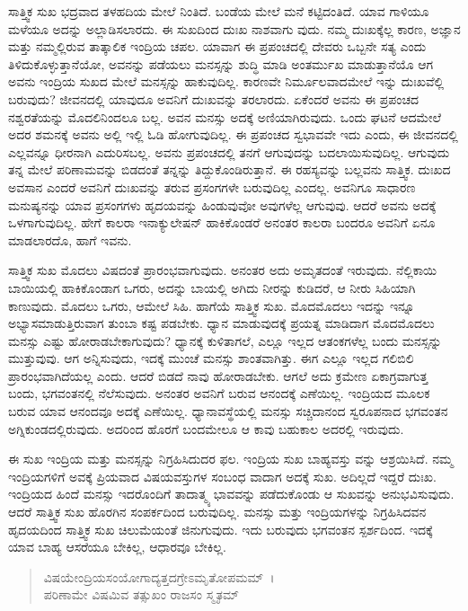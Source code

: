 ಸಾತ್ತ್ವಿಕ ಸುಖ ಭದ್ರವಾದ ತಳಹದಿಯ ಮೇಲೆ ನಿಂತಿದೆ. ಬಂಡೆಯ ಮೇಲೆ ಮನೆ ಕಟ್ಟಿದಂತಿದೆ. ಯಾವ ಗಾಳಿಯೂ ಮಳೆಯೂ ಅದನ್ನು ಅಲ್ಲಾಡಿಸಲಾರದು. ಈ ಸುಖದಿಂದ ದುಃಖ ನಾಶವಾಗು ವುದು. ನಮ್ಮ ದುಃಖಕ್ಕೆಲ್ಲ ಕಾರಣ, ಅಜ್ಞಾನ ಮತ್ತು ನಮ್ಮಲ್ಲಿರುವ ತಾತ್ಕಾಲಿಕ ಇಂದ್ರಿಯ ಚಪಲ. ಯಾವಾಗ ಈ ಪ್ರಪಂಚದಲ್ಲಿ ದೇವರು ಒಬ್ಬನೇ ಸತ್ಯ ಎಂದು ತಿಳಿದುಕೊಳ್ಳುತ್ತಾನೆಯೋ, ಅವನನ್ನು ಪಡೆಯಲು ಮನಸ್ಸನ್ನು ಶುದ್ಧಿ ಮಾಡಿ ಅಂತರ್ಮುಖ ಮಾಡುತ್ತಾನೆಯೊ ಆಗ ಅವನು ಇಂದ್ರಿಯ ಸುಖದ ಮೇಲೆ ಮನಸ್ಸನ್ನು ಹಾಕುವುದಿಲ್ಲ. ಕಾರಣವೇ ನಿರ್ಮೂಲವಾದಮೇಲೆ ಇನ್ನು ದುಃಖವೆಲ್ಲಿ ಬರುವುದು? ಜೀವನದಲ್ಲಿ ಯಾವುದೂ ಅವನಿಗೆ ದುಃಖವನ್ನು ತರಲಾರದು. ಏಕೆಂದರೆ ಅವನು ಈ ಪ್ರಪಂಚದ ನಶ್ವರತೆಯನ್ನು ಮೊದಲಿನಿಂದಲೂ ಬಲ್ಲ. ಅವನ ಮನಸ್ಸು ಅದಕ್ಕೆ ಅಣಿಯಾಗಿರುವುದು. ಒಂದು ಘಟನೆ ಆದಮೇಲೆ ಅದರ ಶಮನಕ್ಕೆ ಅವನು ಅಲ್ಲಿ ಇಲ್ಲಿ ಓಡಿ ಹೋಗುವುದಿಲ್ಲ. ಈ ಪ್ರಪಂಚದ ಸ್ವಭಾವವೇ ಇದು ಎಂದು, ಈ ಜೀವನದಲ್ಲಿ ಎಲ್ಲವನ್ನೂ ಧೀರನಾಗಿ ಎದುರಿಸಬಲ್ಲ. ಅವನು ಪ್ರಪಂಚದಲ್ಲಿ ತನಗೆ ಆಗುವುದನ್ನು ಬದಲಾಯಿಸುವುದಿಲ್ಲ. ಆಗುವುದು ತನ್ನ ಮೇಲೆ ಪರಿಣಾಮವನ್ನು ಬಿಡದಂತೆ ತನ್ನನ್ನು ತಿದ್ದುಕೊಂಡಿರುತ್ತಾನೆ. ಈ ರಹಸ್ಯವನ್ನು ಬಲ್ಲವನು ಸಾತ್ತ್ವಿಕ. ದುಃಖದ ಅವಸಾನ ಎಂದರೆ ಅವನಿಗೆ ದುಃಖವನ್ನು ತರುವ ಪ್ರಸಂಗಗಳೇ ಬರುವುದಿಲ್ಲ ಎಂದಲ್ಲ. ಅವನಿಗೂ ಸಾಧಾರಣ ಮನುಷ್ಯನನ್ನು ಯಾವ ಪ್ರಸಂಗಗಳು ಹೃದಯವನ್ನು ಹಿಂಡುವುವೋ ಅವುಗಳೆಲ್ಲ ಆಗುವುವು. ಆದರೆ ಅವನು ಅದಕ್ಕೆ ಒಳಗಾಗುವುದಿಲ್ಲ. ಹೇಗೆ ಕಾಲರಾ ಇನಾಕ್ಯುಲೇಷನ್ ಹಾಕಿಕೊಂಡರೆ ಅನಂತರ ಕಾಲರಾ ಬಂದರೂ ಅವನಿಗೆ ಏನೂ ಮಾಡಲಾರದೊ, ಹಾಗೆ ಇವನು.

ಸಾತ್ತ್ವಿಕ ಸುಖ ಮೊದಲು ವಿಷದಂತೆ ಪ್ರಾರಂಭವಾಗುವುದು. ಅನಂತರ ಅದು ಅಮೃತದಂತೆ ಇರುವುದು. ನೆಲ್ಲಿಕಾಯಿ ಬಾಯಿಯಲ್ಲಿ ಹಾಕಿಕೊಂಡಾಗ ಒಗರು, ಅದನ್ನು ಬಾಯಲ್ಲಿ ಅಗಿದು ನೀರನ್ನು ಕುಡಿದರೆ, ಆ ನೀರು ಸಿಹಿಯಾಗಿ ಕಾಣುವುದು. ಮೊದಲು ಒಗರು, ಆಮೇಲೆ ಸಿಹಿ. ಹಾಗೆಯೆ ಸಾತ್ತ್ವಿಕ ಸುಖ. ಮೊದಮೊದಲು ಇದನ್ನು ಇನ್ನೂ ಅಭ್ಯಾಸಮಾಡುತ್ತಿರುವಾಗ ತುಂಬಾ ಕಷ್ಟ ಪಡಬೇಕು. ಧ್ಯಾನ ಮಾಡುವುದಕ್ಕೆ ಪ್ರಯತ್ನ ಮಾಡಿದಾಗ ಮೊದಮೊದಲು ಮನಸ್ಸು ಎಷ್ಟು ಹೋರಾಡಬೇಕಾಗುವುದು? ಧ್ಯಾನಕ್ಕೆ ಕುಳಿತಾಗಲೆ, ಎಲ್ಲೂ ಇಲ್ಲದ ಆತಂಕಗಳೆಲ್ಲ ಬಂದು ಮನಸ್ಸನ್ನು ಮುತ್ತುವುವು. ಆಗ ಅನ್ನಿಸುವುದು, ಇದಕ್ಕೆ ಮುಂಚೆ ಮನಸ್ಸು ಶಾಂತವಾಗಿತ್ತು. ಈಗ ಎಲ್ಲೂ ಇಲ್ಲದ ಗಲಿಬಿಲಿ ಪ್ರಾರಂಭವಾಗಿದೆಯಲ್ಲ ಎಂದು. ಆದರೆ ಬಿಡದೆ ನಾವು ಹೋರಾಡಬೇಕು. ಆಗಲೆ ಅದು ಕ್ರಮೇಣ ಏಕಾಗ್ರವಾಗುತ್ತ ಬಂದು, ಭಗವಂತನಲ್ಲಿ ನೆಲೆಸುವುದು. ಅನಂತರ ಅವನಿಗೆ ಬರುವ ಆನಂದಕ್ಕೆ ಎಣೆಯಿಲ್ಲ. ಇಂದ್ರಿಯದ ಮೂಲಕ ಬರುವ ಯಾವ ಆನಂದವೂ ಅದಕ್ಕೆ ಎಣೆಯಿಲ್ಲ. ಧ್ಯಾನಾವಸ್ಥೆಯಲ್ಲಿ ಮನಸ್ಸು ಸಚ್ಚಿದಾನಂದ ಸ್ವರೂಪನಾದ ಭಗವಂತನ ಅಗ್ನಿಕುಂಡದಲ್ಲಿರುವುದು. ಅದರಿಂದ ಹೊರಗೆ ಬಂದಮೇಲೂ ಆ ಕಾವು ಬಹುಕಾಲ ಅದರಲ್ಲಿ ಇರುವುದು.

ಈ ಸುಖ ಇಂದ್ರಿಯ ಮತ್ತು ಮನಸ್ಸನ್ನು ನಿಗ್ರಹಿಸಿದುದರ ಫಲ. ಇಂದ್ರಿಯ ಸುಖ ಬಾಹ್ಯವಸ್ತು ವನ್ನು ಆಶ್ರಯಿಸಿದೆ. ನಮ್ಮ ಇಂದ್ರಿಯಗಳಿಗೆ ಅವಕ್ಕೆ ಪ್ರಿಯವಾದ ವಿಷಯವಸ್ತುಗಳ ಸಂಬಂಧ ವಾದಾಗ ಅದಕ್ಕೆ ಸುಖ. ಅದಿಲ್ಲದೆ ಇದ್ದರೆ ದುಃಖ. ಇಂದ್ರಿಯದ ಹಿಂದೆ ಮನಸ್ಸು ಇದರೊಂದಿಗೆ ತಾದಾತ್ಮ್ಯ ಭಾವವನ್ನು ಪಡೆದುಕೊಂಡು ಆ ಸುಖವನ್ನು ಅನುಭವಿಸುವುದು. ಆದರೆ ಸಾತ್ತ್ವಿಕ ಸುಖ ಹೊರಗಿನ ಸಂಪರ್ಕದಿಂದ ಬರುವುದಿಲ್ಲ. ಮನಸ್ಸು ಮತ್ತು ಇಂದ್ರಿಯಗಳನ್ನು ನಿಗ್ರಹಿಸಿದವನ ಹೃದಯದಿಂದ ಸಾತ್ತ್ವಿಕ ಸುಖ ಚಿಲುಮೆಯಂತೆ ಜಿನುಗುವುದು. ಇದು ಬರುವುದು ಭಗವಂತನ ಸ್ಪರ್ಶದಿಂದ. ಇದಕ್ಕೆ ಯಾವ ಬಾಹ್ಯ ಆಸರೆಯೂ ಬೇಕಿಲ್ಲ, ಆಧಾರವೂ ಬೇಕಿಲ್ಲ.

\begin{verse}
ವಿಷಯೇಂದ್ರಿಯಸಂಯೋಗಾದ್ಯತ್ತದಗ್ರೇಽಮೃತೋಪಮಮ್~।\\ಪರಿಣಾಮೇ ವಿಷಮಿವ ತತ್ಸುಖಂ ರಾಜಸಂ ಸ್ಮೃತಮ್ 
\end{verse}

